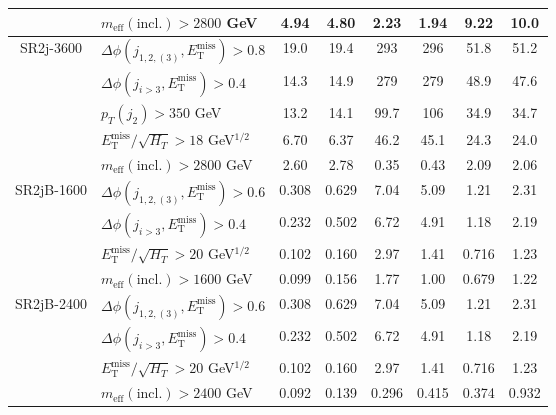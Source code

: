 \documentclass[10pt,fleqn]{article}
\newcommand{\met}{E^\mathrm{miss}_\mathrm{T}}
\newcommand{\meff}{m_\mathrm{eff}}
\begin{document}
\begin{table}[h!]
\begin{tabular}{c|l|c|c|c|c|c|c}
             & $\meff(\mathrm{incl.}) > 2800$ GeV              &     4.94   &   4.80    &  2.23      &   1.94    &      9.22    &   10.0         \\ \midrule             
SR2j-3600    & $\Delta\phi(j_{1,2,(3)},\met) > 0.8$            &     19.0   &   19.4    &  293       &   296     &      51.8    &   51.2         \\
             & $\Delta\phi(j_{i>3},\met) > 0.4$                &     14.3   &   14.9    &  279       &   279     &      48.9    &   47.6         \\
             & $p_T(j_2) > 350$ GeV                            &     13.2   &   14.1    &  99.7      &   106     &      34.9    &   34.7         \\                        
             & $\met/\sqrt{H_T} > 18$ GeV$^{1/2}$              &     6.70   &   6.37    &  46.2      &   45.1    &      24.3    &   24.0         \\    
             & $\meff(\mathrm{incl.}) > 2800$ GeV              &     2.60   &   2.78    &  0.35      &   0.43    &      2.09    &   2.06         \\ \midrule         
SR2jB-1600   & $\Delta\phi(j_{1,2,(3)},\met) > 0.6$            &     0.308  &   0.629   &  7.04      &   5.09    &      1.21    &   2.31         \\
             & $\Delta\phi(j_{i>3},\met) > 0.4$                &     0.232  &   0.502   &  6.72      &   4.91    &      1.18    &   2.19         \\                        
             & $\met/\sqrt{H_T} > 20$ GeV$^{1/2}$              &     0.102  &   0.160   &  2.97      &   1.41    &      0.716   &   1.23         \\    
             & $\meff(\mathrm{incl.}) > 1600$ GeV              &     0.099  &   0.156   &  1.77      &   1.00    &      0.679   &   1.22         \\ \midrule      
SR2jB-2400   & $\Delta\phi(j_{1,2,(3)},\met) > 0.6$            &     0.308  &   0.629   &  7.04      &   5.09    &      1.21    &   2.31         \\
             & $\Delta\phi(j_{i>3},\met) > 0.4$                &     0.232  &   0.502   &  6.72      &   4.91    &      1.18    &   2.19         \\                        
             & $\met/\sqrt{H_T} > 20$ GeV$^{1/2}$              &     0.102  &   0.160   &  2.97      &   1.41    &      0.716   &   1.23         \\    
             & $\meff(\mathrm{incl.}) > 2400$ GeV              &     0.092  &   0.139   &  0.296     &   0.415   &      0.374   &   0.932        \\ \bottomrule                 
 \end{tabular}
\end{table}  
\end{document}

